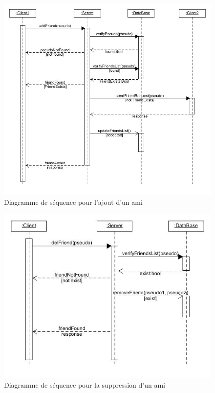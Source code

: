 \documentclass[a4paper,12pt]{article}
\begin{document}
\begin{figure}
\centering
\includegraphics[scale=0.5]{images/add_friend.jpg}
\caption{Diagramme de séquence pour l'ajout d'un ami }
\end{figure}

\newpage
\begin{figure}
\centering
\includegraphics[scale=0.5]{images/del_friend.jpg}
\caption{Diagramme de séquence pour la suppression d'un ami }
\end{figure}
\end{document}
